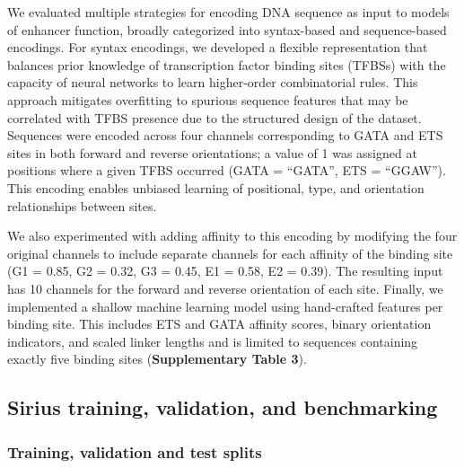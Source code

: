 We evaluated multiple strategies for encoding DNA sequence as input to models of enhancer function, broadly categorized into syntax-based and sequence-based encodings. For syntax encodings, we developed a flexible representation that balances prior knowledge of transcription factor binding sites (TFBSs) with the capacity of neural networks to learn higher-order combinatorial rules. This approach mitigates overfitting to spurious sequence features that may be correlated with TFBS presence due to the structured design of the dataset. Sequences were encoded across four channels corresponding to GATA and ETS sites in both forward and reverse orientations; a value of 1 was assigned at positions where a given TFBS occurred (GATA = “GATA”, ETS = “GGAW”). This encoding enables unbiased learning of positional, type, and orientation relationships between sites. 

We also experimented with adding affinity to this encoding by modifying the four original channels to include separate channels for each affinity of the binding site (G1 = 0.85, G2 = 0.32, G3 = 0.45, E1 = 0.58, E2 = 0.39). The resulting input has 10 channels for the forward and reverse orientation of each site. Finally, we implemented a shallow machine learning model using hand-crafted features per binding site. This includes ETS and GATA affinity scores, binary orientation indicators, and scaled linker lengths and is limited to sequences containing exactly five binding sites (\textbf{Supplementary Table 3}).

\subsection{Sirius training, validation, and benchmarking}

\subsubsection{Training, validation and test splits}

